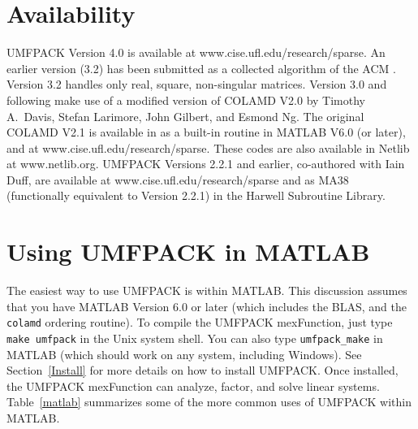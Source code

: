 \section{Availability}

UMFPACK Version 4.0 is available at www.cise.ufl.edu/research/sparse.
An earlier version (3.2) has been submitted as a collected algorithm of the ACM
\cite{Davis02_algo,Davis02}.  Version 3.2 handles only real, square,
non-singular matrices.  Version 3.0 and following make
use of a modified version of COLAMD V2.0 by Timothy A.~Davis, Stefan
Larimore, John Gilbert, and Esmond Ng.  The original COLAMD V2.1 is available in
as a built-in routine in MATLAB V6.0 (or later), and at
www.cise.ufl.edu/research/sparse.
These codes are also available in Netlib \cite{netlib} at
www.netlib.org.
UMFPACK Versions 2.2.1 and earlier, co-authored with Iain Duff,
are available at \newline
www.cise.ufl.edu/research/sparse and as MA38 (functionally
equivalent to Version 2.2.1) in the Harwell Subroutine Library.

\section{Using UMFPACK in MATLAB}

The easiest way to use UMFPACK is within MATLAB.  This discussion assumes that
you have MATLAB Version 6.0 or later (which includes the BLAS, and the
{\tt colamd} ordering routine).  To compile the UMFPACK mexFunction, just
type {\tt make umfpack} in the Unix system shell.   You can also type
{\tt umfpack\_make} in MATLAB (which should work on any system, including
Windows).  See Section~\ref{Install} for more details on how to install UMFPACK.
Once installed, the UMFPACK mexFunction can analyze, factor, and solve linear
systems.  Table~\ref{matlab} summarizes some of the more common uses
of UMFPACK within MATLAB.

